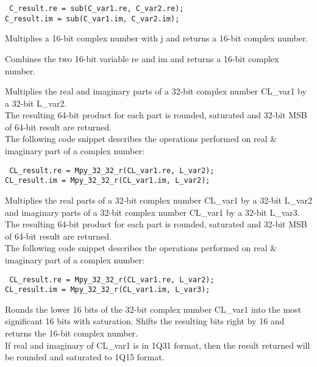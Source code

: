 {\tt {} C\_result.re = sub(C\_var1.re, C\_var2.re);\\
      C\_result.im = sub(C\_var1.im, C\_var2.im);
}


Multiplies a 16-bit complex number with j and returns a 16-bit complex number.


Combines the two 16-bit variable re and im and returns a 16-bit complex number.


Multiplies the real and imaginary parts of a 32-bit complex number CL\_var1 by a 32-bit L\_var2.\\
The resulting 64-bit product for each part is rounded, saturated and 32-bit MSB of 64-bit result are returned.\\
The following code snippet describes the operations performed on real \& imaginary part of a complex number:

{\tt {} CL\_result.re = Mpy\_32\_32\_r(CL\_var1.re, L\_var2);\\
      CL\_result.im = Mpy\_32\_32\_r(CL\_var1.im, L\_var2);
}


Multiplies the real parts of a 32-bit complex number CL\_var1 by a 32-bit L\_var2 and imaginary parts of a 32-bit complex number CL\_var1 by a 32-bit L\_var3.
The resulting 64-bit product for each part is rounded, saturated and 32-bit MSB of 64-bit result are returned.\\
The following code snippet describes the operations performed on real \& imaginary part of a complex number:

{\tt {} CL\_result.re = Mpy\_32\_32\_r(CL\_var1.re, L\_var2);\\
      CL\_result.im = Mpy\_32\_32\_r(CL\_var1.im, L\_var3);
}


Rounds the lower 16 bits of the 32-bit complex number CL\_var1 into the most significant 16 bits with saturation.
Shifts the resulting bits right by 16 and returns the 16-bit complex number.\\
If real and imaginary of CL\_var1 is in 1Q31 format, then the result returned will be rounded and saturated to 1Q15 format.

